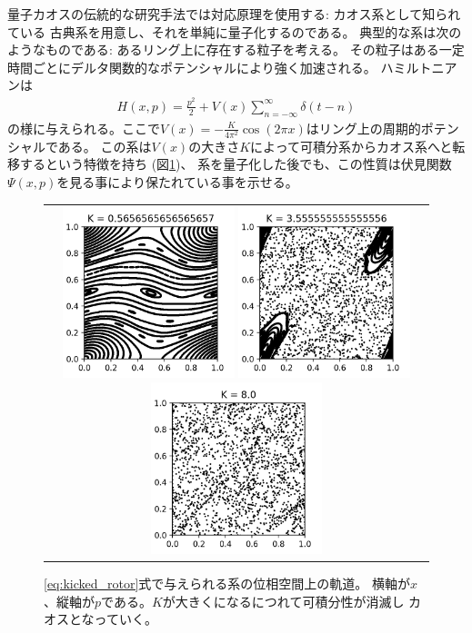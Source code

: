 量子カオスの伝統的な研究手法では対応原理を使用する: カオス系として知られている
古典系を用意し、それを単純に量子化するのである。
典型的な系は次のようなものである\cite{ullmo}: あるリング上に存在する粒子を考える。
その粒子はある一定時間ごとにデルタ関数的なポテンシャルにより強く加速される。
ハミルトニアンは
\begin{align}
	H(x, p) = \frac{p^2}{2} + V(x)\sum_{n=-\infty}^{\infty}\delta(t-n)
	\label{eq:kicked_rotor}
\end{align}
の様に与えられる。ここで$V(x) = -\frac{K}{4\pi^2}\cos(2\pi x)$はリング上の周期的ポテンシャルである。
この系は$V(x)$の大きさ$K$によって可積分系からカオス系へと転移するという特徴を持ち
(図\ref{fig:phase_space_of_kicked_rotor})、
系を量子化した後でも、この性質は伏見関数$\Psi(x, p)$を見る事により保たれている事を示せる。
\begin{figure}[ht]
	\centering
	\begin{tabular}{c}
		\begin{minipage}{0.33\hsize}
			\centering
			\includegraphics[width=5cm]{figures/figure7}
		\end{minipage}
		\begin{minipage}{0.33\hsize}
			\centering
			\includegraphics[width=5cm]{figures/figure44}
		\end{minipage}
		\begin{minipage}{0.33\hsize}
			\centering
			\includegraphics[width=5cm]{figures/figure99}
		\end{minipage}
	\end{tabular}
	\caption{\eqref{eq:kicked_rotor}式で与えられる系の位相空間上の軌道。
		横軸が$x$、縦軸が$p$である。$K$が大きくになるにつれて可積分性が消滅し
		カオスとなっていく。}
	\label{fig:phase_space_of_kicked_rotor}
\end{figure}

